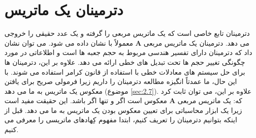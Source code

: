 \section{\textbf{دترمینان یک ماتریس}}
\label{sec:2.5}
{
    \Large
    \begin{spacing}{1.5}
        دترمینان تابع خاصی است که یک ماتریس مربعی را گرفته و یک عدد حقیقی را خروجی می دهد.
        دترمینان یک ماتریس مربعی $\textbf{A}$ معمولاً با  نشان داده می شود.
        می توان نشان داد که دترمینان دارای تفسیر هندسی مربوط به حجم جعبه ها است و اطلاعاتی در مورد چگونگی تغییر حجم ها تحت تبدیل های خطی ارائه می دهد.
        علاوه بر این، دترمینان ها برای حل سیستم های معادلات خطی با استفاده از قانون کرامر استفاده می شوند.
        با این حال، ما عمدتاً انگیزه مطالعه دترمینان را داریم زیرا فرمولی صریح برای یافتن معکوس یک ماتریس به ما می دهد (موضوع \ref{sec:2.7}).
        علاوه بر این، می توان ثابت کرد که: یک ماتریس مربعی $\textbf{A}$ معکوس است اگر و تنها اگر باشد.
        این حقیقت مفید است زیرا یک ابزار محاسباتی برای تعیین معکوس بودن یک ماتریس به ما می دهد.
        قبل از اینکه بتوانیم دترمینان را تعریف کنیم، ابتدا مفهوم کِهادهای ماتریسی را معرفی می کنیم.
    \end{spacing}
}

